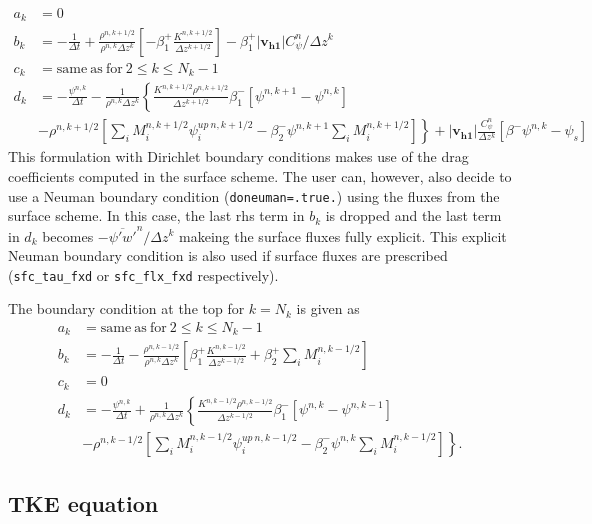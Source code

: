 \documentclass[dvipdfmx,a4paper,10pt]{article}
\begin{document}
\begin{align*}
  a_k &= 0 \\
    b_k &= -\frac{1}{\Delta t} +\frac{\rho^{n,k+1/2}}{\rho^{n,k}\Delta z^k} \left[- \beta_1^+\frac{K^{n,k+1/2}}{\Delta z^{k+1/2}} \right]-\beta_1^+|\mathbf{v_{h1}}|C^n_{\psi}/\Delta z^k  \\
      c_k &= \mathrm{same~as~for~}2\leq k \leq N_k-1 \\
      d_k &=  -\frac{\psi^{n,k}}{\Delta t} - \frac{1}{\rho^{n,k}\Delta z^k} \left\{ \frac{K^{n,k+1/2}\rho^{n,k+1/2}}{\Delta z^{k+1/2}}\beta_1^{-}\left[\psi^{n,k+1} - \psi^{n,k}\right]\right.   \\   
          & \left. -\rho^{n,k+1/2}\left[\sum_iM_i^{n,k+1/2}\psi_i^{up~n,k+1/2} -\beta_2^{-}\psi^{n,k+1}\sum_iM_i^{n,k+1/2} \right] \right\} +|\mathbf{v_{h1}}|\frac{C^n_{\psi}}{\Delta z^k}\left[\beta^-\psi^{n,k} - \psi_s\right]    
\end{align*}
This formulation with Dirichlet boundary conditions makes use of the drag coefficients computed in the surface scheme. The user can, however, also decide to use a Neuman boundary condition ({\tt doneuman=.true.}) using the fluxes from the surface scheme. In this case, the last rhs term in $b_k$ is dropped and the last term in $d_k$ becomes $- \overline{\psi'w'}^n/\Delta z^k$ makeing the surface fluxes fully explicit. This explicit Neuman boundary condition is also used if surface fluxes are prescribed ({\tt sfc\_tau\_fxd} or {\tt sfc\_flx\_fxd} respectively). 

The boundary condition at the top for $k=N_k$ is given as
\begin{align*}
  a_k &= \mathrm{same~as~for~}2\leq k \leq N_k-1  \\
    b_k &= -\frac{1}{\Delta t} - \frac{\rho^{n,k-1/2}}{\rho^{n,k}\Delta z^k} \left[\beta_1^+\frac{K^{n,k-1/2}}{\Delta z ^{k-1/2}}+\beta_2^+\sum_iM_i^{n,k-1/2} \right] \\
      c_k &= 0 \\
      d_k &= -\frac{\psi^{n,k}}{\Delta t} + \frac{1}{\rho^{n,k}\Delta z^k} \left\{ \frac{K^{n,k-1/2}\rho^{n,k-1/2}}{\Delta z^{k-1/2}}\beta_1^{-}\left[\psi^{n,k} - \psi^{n,k-1}\right]\right.   \\   
          & \left.-\rho^{n,k-1/2}\left[\sum_iM_i^{n,k-1/2}\psi_i^{up~n,k-1/2} -\beta_2^{-}\psi^{n,k}\sum_iM_i^{n,k-1/2} \right]\right\}.    
\end{align*}

\subsection{TKE equation}
\end{document}
